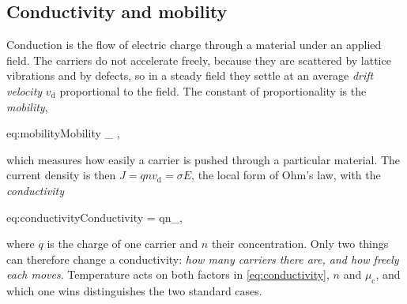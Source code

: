     \subsection{Conductivity and mobility}

        Conduction is the flow of electric charge through a material under an applied field. The carriers do not accelerate freely, because they are scattered by lattice vibrations and by defects, so in a steady field they settle at an average \emph{drift velocity} $v_{\text{d}}$ proportional to the field. The constant of proportionality is the \emph{mobility},

        \begin{keyeq}{eq:mobility}{Mobility}
            \mu_{} \equiv {},
        \end{keyeq}

        which measures how easily a carrier is pushed through a particular material. The current density is then $J = qnv_{\text{d}} = \sigma E$, the local form of Ohm's law, with the \emph{conductivity}

        \begin{keyeq}{eq:conductivity}{Conductivity}
            \sigma = qn\mu_{},
        \end{keyeq}

        where $q$ is the charge of one carrier and $n$ their concentration. Only two things can therefore change a conductivity: \emph{how many carriers there are, and how freely each moves}. Temperature acts on both factors in \cref{eq:conductivity}, $n$ and $\mu_{\text{c}}$, and which one wins distinguishes the two standard cases.

